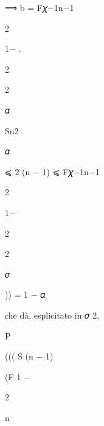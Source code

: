 \documentclass[a4paper,portrait,12pt]{article}
\begin{document}
\begin{flushleft}
⟹ b = F𝜒$-$1n$-$1
\end{flushleft}


2


1$-$ .


2


2





\begin{flushleft}
𝛼
\end{flushleft}


\begin{flushleft}
Sn2
\end{flushleft}


\begin{flushleft}
𝛼
\end{flushleft}


\begin{flushleft}
⩽ 2 (n $-$ 1) ⩽ F𝜒$-$1n$-$1
\end{flushleft}


2


1$-$


2


2


\begin{flushleft}
𝜎
\end{flushleft}





\begin{flushleft}
)) = 1 $-$ 𝛼
\end{flushleft}





\begin{flushleft}
che d\`{a}, esplicitato in 𝜎 2,
\end{flushleft}


\begin{flushleft}
P
\end{flushleft}





\begin{flushleft}
((( S (n $-$ 1)
\end{flushleft}


\begin{flushleft}
(F 1 $-$
\end{flushleft}


2


\begin{flushleft}
n
\end{flushleft}
\end{document}
